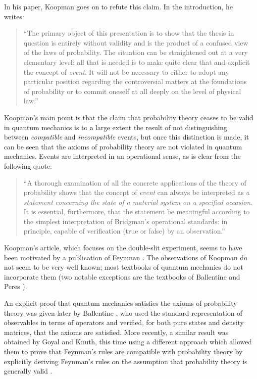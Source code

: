 \documentclass [12pt]{revtex4}
\begin{document}
In his paper, Koopman goes on to refute this claim. In the introduction, he writes:
\begin{quote}
``The primary object of this presentation is to show that the thesis in question is entirely without validity and is the product of a confused view of the laws of probability. The situation can be straightened out at a very elementary level: all that is needed is to make quite clear that and explicit the concept of {\it event}. It will not be necessary to either to adopt any particular position regarding the controversial matters at the foundations of probability or to commit oneself at all deeply on the level of physical law.''
\end{quote}
Koopman's main point is that the claim that probability theory ceases to be valid in quantum mechanics is to a large extent the result of not distinguishing between {\it compatible} and {\it incompatible} events, but once this distinction is made, it can be seen that the axioms of probability theory are not violated in quantum mechanics. Events are interpreted in an operational sense, as is clear from the following quote:
\begin{quote}
``A thorough examination of all the concrete applications of the theory of probability shows that the concept of {\it event} can always be interpreted as {\it a statement concerning the state of a material system on a specified occasion}. It is essential, furthermore, that the statement be meaningful according to the simplest interpretation of Bridgman's operational standards: in principle, capable of verification (true or false) by an observation.''
\end{quote}
Koopman's article, which focuses on the double-slit experiment, seems to have been motivated by a publication of Feynman \cite{F1951}. The observations of Koopman do not seem to be very well known; most textbooks of quantum mechanics do not incorporate them (two notable exceptions are the textbooks of Ballentine \cite{B1998} and Peres \cite{P1995}).

An explicit proof that quantum mechanics satisfies the axioms of probability theory was given later by Ballentine \cite {B1986}, who used the standard representation of observables in terms of operators and verified, for both pure states and density matrices, that the axioms are satisfied. More recently, a similar result was obtained by Goyal and Knuth, this time using a different approach which allowed them to prove that Feynman's rules are compatible with probability theory by explicitly deriving Feynman's rules on the assumption that probability theory is generally valid \cite {GK2011}.
\end{document}
